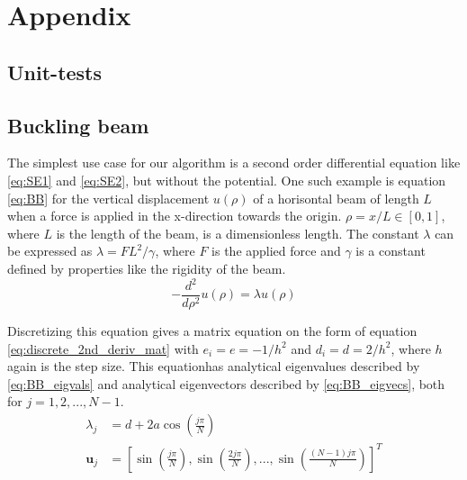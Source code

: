 \documentclass[reprint,english,notitlepage,nofootinbib]{revtex4-1}  %
\begin{document}
\section{Appendix}
\label{appendix}

\subsection{Unit-tests}


\subsection{Buckling beam}

The simplest use case for our algorithm is a second order differential equation like \ref{eq:SE1} and \ref{eq:SE2}, but without the potential. One such example is equation \ref{eq:BB} for the vertical displacement $u(\rho)$ of a horisontal beam of length $L$ when a force is applied in the x-direction towards the origin. $\rho = x/L \in [0, 1]$, where $L$ is the length of the beam, is a dimensionless length. The constant $\lambda$ can be expressed as $\lambda = F L^2 / \gamma$, where $F$ is the applied force and $\gamma$ is a constant defined by properties like the rigidity of the beam.
\begin{equation}
	-\frac{d^2}{d\rho^2}u(\rho) = \lambda u(\rho)
	\label{eq:BB}
\end{equation}

Discretizing this equation gives a matrix equation on the form of equation \ref{eq:discrete_2nd_deriv_mat} with $e_i = e = -1/h^2$ and $d_i = d = 2/h^2$, where $h$ again is the step size. This equationhas analytical eigenvalues described by \ref{eq:BB_eigvals} and analytical eigenvectors described by \ref{eq:BB_eigvecs}, both for $j = 1, 2, ..., N-1$.
\begin{align}
  \lambda_j &= d + 2 a \cos{\left( \frac{j \pi}{N} \right)} \label{eq:BB_eigvals} \\
  \mathbf u_j &= \left[ \sin{\left( \frac{j \pi}{N} \right)}, \sin{\left( \frac{2 j \pi}{N} \right)}, ..., \sin{\left( \frac{(N-1) j \pi}{N} \right)} \right]^T \label{eq:BB_eigvecs}
\end{align}
\end{document}
